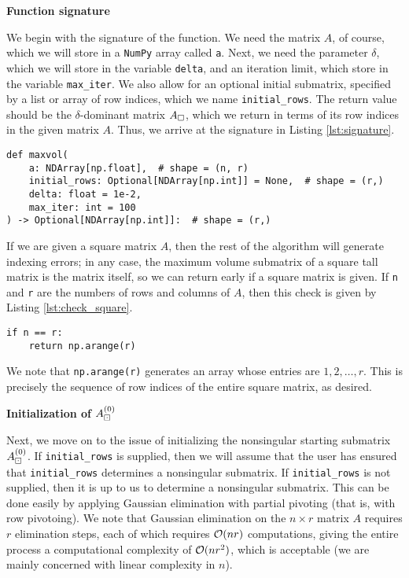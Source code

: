 \documentclass{article}
\begin{document}
	\newcommand{\va}{\texttt{a}}
	\newcommand{\vinitialrows}{\texttt{initial\_rows}}
	\newcommand{\vdelta}{\texttt{delta}}
	\newcommand{\vmaxiter}{\texttt{max\_iter}}
	
	\textbf{Function signature}
	
	We begin with the signature of the \maxvol{} function. We need the matrix $A$, of course, which we will store in a \texttt{NumPy} array called \va. Next, we need the parameter $\delta$, which we will store in the variable \vdelta, and an iteration limit, which store in the variable \vmaxiter. We also allow for an optional initial submatrix, specified by a list or array of row indices, which we name \vinitialrows. The return value should be the $\delta$-dominant matrix $A_\square$, which we return in terms of its row indices in the given matrix $A$. Thus, we arrive at the signature in Listing \ref{lst:signature}.
	\begin{lstlisting}[caption={function signature}, label=lst:signature]
def maxvol(
    a: NDArray[np.float],  # shape = (n, r)
    initial_rows: Optional[NDArray[np.int]] = None,  # shape = (r,)
    delta: float = 1e-2,
    max_iter: int = 100
) -> Optional[NDArray[np.int]]:  # shape = (r,)
	\end{lstlisting}
	
	If we are given a square matrix $A$, then the rest of the algorithm will generate indexing errors; in any case, the maximum volume submatrix of a square tall matrix is the matrix itself, so we can return early if a square matrix is given. If \texttt{n} and \texttt{r} are the numbers of rows and columns of $A$, then this check is given by Listing \ref{lst:check_square}.
	\begin{lstlisting}[caption={square matrix check}, label=lst:check_square]
if n == r:
    return np.arange(r)
	\end{lstlisting}
	We note that \texttt{np.arange(r)} generates an array whose entries are $1,2,\dots, r$. This is precisely the sequence of row indices of the entire square matrix, as desired.
	
	\textbf{Initialization of $A_\boxdot^{(0)}$}
	
	Next, we move on to the issue of initializing the nonsingular starting submatrix $A_\boxdot^{(0)}$. If \vinitialrows{} is supplied, then we will assume that the user has ensured that \vinitialrows{}  determines a nonsingular submatrix. If \vinitialrows{} is not supplied, then it is up to us to determine a nonsingular submatrix. This can be done easily by applying Gaussian elimination with partial pivoting (that is, with row pivotoing). We note that Gaussian elimination on the $n\times r$ matrix $A$ requires $r$ elimination steps, each of which requires $\mathcal{O}(nr)$ computations, giving the entire process a computational complexity of $\mathcal{O}(nr^2)$, which is acceptable (we are mainly concerned with linear complexity in $n$).
	
\end{document}
